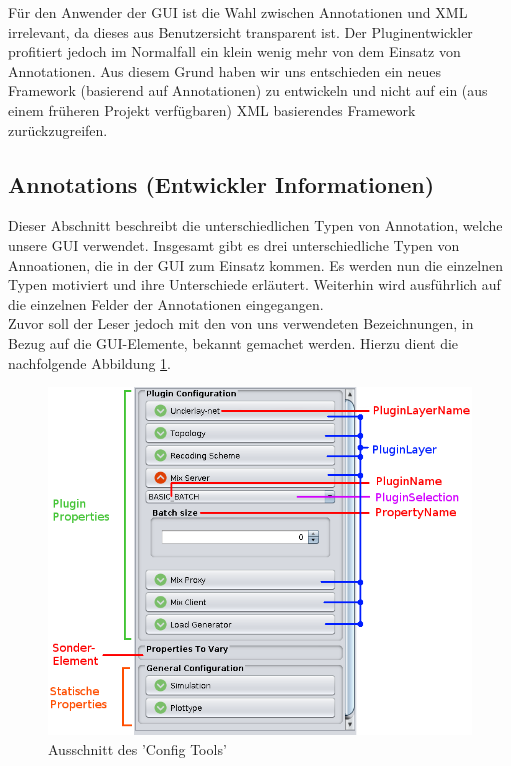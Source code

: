 \documentclass[a4paper, 11pt]{article} %
\begin{document}
Für den Anwender der GUI ist die Wahl zwischen Annotationen und XML irrelevant, da dieses aus Benutzersicht transparent ist. Der Pluginentwickler profitiert jedoch im Normalfall ein klein wenig mehr von dem Einsatz von Annotationen. Aus diesem Grund haben wir uns entschieden ein neues Framework (basierend auf Annotationen) zu entwickeln und nicht auf ein (aus einem früheren Projekt verfügbaren) XML basierendes Framework zurückzugreifen.



\newpage
\subsection{Annotations (Entwickler Informationen)} %
\label{sub:annotations}
Dieser Abschnitt beschreibt die unterschiedlichen Typen von Annotation, welche unsere GUI verwendet. Insgesamt gibt es drei unterschiedliche Typen von Annoationen, die in der GUI zum Einsatz kommen. Es werden nun die einzelnen Typen motiviert und ihre Unterschiede erläutert. Weiterhin wird ausführlich auf die einzelnen Felder der Annotationen eingegangen.\\

Zuvor soll der Leser jedoch mit den von uns verwendeten Bezeichnungen, in Bezug auf die GUI-Elemente, bekannt gemachet werden. Hierzu dient die nachfolgende Abbildung \ref{fig:guielements}. 

\begin{figure}[!htp]

\includegraphics[scale=0.56]{img/configtool_edit.png}

\caption{Ausschnitt des 'Config Tools'}
\label{fig:guielements}
\end{figure}
\end{document}

